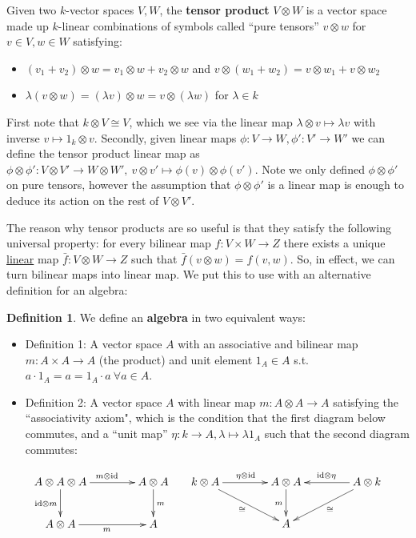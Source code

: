 \documentclass[11pt]{article}
\newcommand{\bb}{\medbreak}
\newcommand{\nt}{\noindent}
\newcommand{\rt}{\xrightarrow{}}
\newcommand{\cd}{\cdot}
\newcommand{\id}{\text{id}}
\newcommand{\define}[1]{\textbf{#1}}
\theoremstyle{definition}
\newtheorem{definition}[lemma]{Definition}
\begin{document}
\nt Given two $k$-vector spaces $V,W$, the \define{tensor product} $V\otimes W$ is a vector space made up $k$-linear combinations of symbols called ``pure tensors'' $v\otimes w$ for $v\in V,w\in W$ satisfying:\begin{itemize}
  \item $(v_1+v_2)\otimes w=v_1\otimes w+v_2\otimes w$ and $v\otimes (w_1+w_2)=v\otimes w_1 +v\otimes w_2$
  \item $\lambda(v\otimes w)=(\lambda v)\otimes w=v\otimes (\lambda w)$ for $\lambda \in k$
\end{itemize}
First note that $k\otimes V\cong V$, which we see via the linear map $\lambda\otimes v\mapsto \lambda v$ with inverse $v\mapsto 1_k\otimes v$. Secondly, given linear maps $\phi: V\rt W, \phi':V'\rt W'$ we can define the tensor product linear map as $\phi\otimes \phi':V\otimes V'\rt W\otimes W',\ v\otimes v'\mapsto \phi(v)\otimes \phi(v')$. Note we only defined $\phi\otimes \phi'$ on pure tensors, however the assumption that $\phi\otimes \phi'$ is a linear map is enough to deduce its action on the rest of $V\otimes V'$.\bb

\nt The reason why tensor products are so useful is that they satisfy the following universal property: for every bilinear map $f:V\times W\rt Z$ there exists a unique \underline{linear} map $\bar{f}:V\otimes W\rt Z$ such that $\bar{f}(v\otimes w)=f(v,w)$. So, in effect, we can turn bilinear maps into linear map. We put this to use with an alternative definition for an algebra:

\begin{definition} We define an \define{algebra} in two equivalent ways:\begin{itemize}
  \item Definition 1: A vector space $A$ with an associative and bilinear map $m: A\times A\rt A$ (the product) and unit element $1_A\in A$ s.t. $a\cd 1_A=a=1_A\cd a\ \forall a\in A$.
  \item Definition 2: A vector space $A$ with linear map $m:A\otimes A\rt A$ satisfying the ``associativity axiom", which is the condition that the first diagram below commutes, and a ``unit map'' $\eta:k\rt A, \lambda\mapsto \lambda 1_A$ such that the second diagram commutes:
\end{itemize}
\begin{useimager}
\begin{equation*}
\xymatrix@C=4em{
  A\otimes A\otimes A \ar[r]^{m\otimes \id} \ar[d]_{\id \otimes m} & A\otimes A \ar[d]^m\\
  A\otimes A \ar[r]_m & A\\
}
\hspace{.5cm}
\xymatrix@C=4em{
  k\otimes A \ar[rd]_{\cong} \ar[r]^{\eta\otimes \id} & A\otimes A \ar[d]_m & A\otimes k \ar[l]_{\id\otimes \eta} \ar[ld]^\cong\\
  & A}
\end{equation*}
\end{useimager}
\end{definition}
\end{document}

